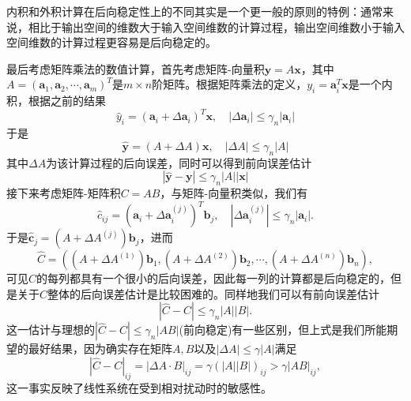 \documentclass[a4paper,10pt]{ctexart}
\begin{document}
内积和外积计算在后向稳定性上的不同其实是一个更一般的原则的特例：通常来说，相比于输出空间的维数大于输入空间维数的计算过程，输出空间维数小于输入空间维数的计算过程更容易是后向稳定的。

最后考虑矩阵乘法的数值计算，首先考虑矩阵-向量积$ \bm{y} = A \bm{x} $，其中$ A=(\bm{a}_1, \bm{a}_2, \cdots , \bm{a}_m)^T $是$ m\times n $阶矩阵。根据矩阵乘法的定义，$ y_i = \bm{a}_i^T \bm{x} $是一个内积，根据之前的结果
\[
    \hat{y}_i = (\bm{a}_i + \Delta \bm{a}_i)^T \bm{x}, \quad |\Delta \bm{a}_i|\leqslant \gamma_n |\bm{a}_i| 
\]
于是
\[
    \hat{\bm{y}} = (A + \Delta A)\bm{x}, \quad |\Delta A|\leqslant \gamma_n |A|
\]
其中$ \Delta A $为该计算过程的后向误差，同时可以得到前向误差估计
\[
    |\hat{\bm{y}} - \bm{y}| \leqslant \gamma_n |A| |\bm{x}|
\]
接下来考虑矩阵-矩阵积$ C=AB $，与矩阵-向量积类似，我们有
\[
    \hat{c}_{ij} = (\bm{a}_i + \Delta \bm{a}_i^{(j)})^T \bm{b}_j, \quad |\Delta \bm{a}_i^{(j)}|\leqslant \gamma_n |\bm{a}_i|.
\]
于是$ \hat{\bm{c}}_j = (A+\Delta A^{(j)})\bm{b}_j $，进而
\[
    \hat{C} = ((A + \Delta A^{(1)})\bm{b}_1, (A + \Delta A^{(2)})\bm{b}_2, \cdots , (A + \Delta A^{(n)})\bm{b}_n),
\]
可见$ C $的每列都具有一个很小的后向误差，因此每一列的计算都是后向稳定的，但是关于$ C $整体的后向误差估计是比较困难的。同样地我们可以有前向误差估计
\[
    |\hat{C}-C|\leqslant \gamma_n |A||B|.
\]
这一估计与理想的$ |\hat{C}-C|\leqslant \gamma_n |AB| $(前向稳定)有一些区别，但上式是我们所能期望的最好结果，因为确实存在矩阵$ A,B $以及$ |\Delta A|\leqslant \gamma |A| $满足
\[
    |\hat{C}-C|_{ij} = |\Delta A\cdot B|_{ij}= \gamma (|A| |B|)_{ij}> \gamma |AB|_{ij},
\]
这一事实反映了线性系统在受到相对扰动时的敏感性。
\end{document}
